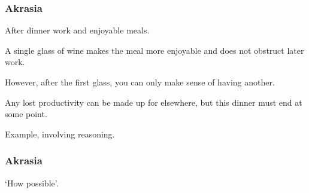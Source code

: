 \documentclass[noamssymb,
]{beamer} %
\newcommand{\hozlinedash}[0]{
  \noindent\hdashrule[0.5ex][c]{\textwidth}{.1pt}{2.5pt}
}
\begin{document}
\begin{frame}
  \frametitle{Akrasia}

  {\rmfamily
    After dinner work and enjoyable meals.

    A single glass of wine makes the meal more enjoyable and does not obstruct later work.

    However, after the first glass, you can only make sense of having another.

    Any lost productivity can be made up for elsewhere, but this dinner must end at some point.
  }

  \hozlinedash

  Example, involving reasoning.
\end{frame}

\begin{frame}
  \frametitle{Akrasia}

  `How possible'.
\end{frame}
\end{document}
